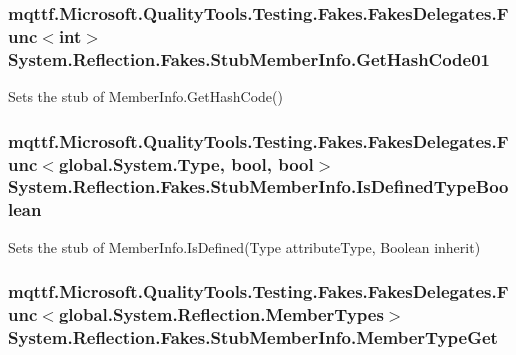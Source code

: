 \hypertarget{class_system_1_1_reflection_1_1_fakes_1_1_stub_member_info_aab0aca05e75dc1213439d8d64429dac8}{
\subsubsection[{Get\-Hash\-Code01}]{\setlength{\rightskip}{0pt plus 5cm}mqttf.\-Microsoft.\-Quality\-Tools.\-Testing.\-Fakes.\-Fakes\-Delegates.\-Func$<$int$>$ System.\-Reflection.\-Fakes.\-Stub\-Member\-Info.\-Get\-Hash\-Code01}}\label{class_system_1_1_reflection_1_1_fakes_1_1_stub_member_info_aab0aca05e75dc1213439d8d64429dac8}


Sets the stub of Member\-Info.\-Get\-Hash\-Code()

\hypertarget{class_system_1_1_reflection_1_1_fakes_1_1_stub_member_info_a39dee76f64c1b23616ba19839cd657ac}{
\subsubsection[{Is\-Defined\-Type\-Boolean}]{\setlength{\rightskip}{0pt plus 5cm}mqttf.\-Microsoft.\-Quality\-Tools.\-Testing.\-Fakes.\-Fakes\-Delegates.\-Func$<$global.\-System.\-Type, bool, bool$>$ System.\-Reflection.\-Fakes.\-Stub\-Member\-Info.\-Is\-Defined\-Type\-Boolean}}\label{class_system_1_1_reflection_1_1_fakes_1_1_stub_member_info_a39dee76f64c1b23616ba19839cd657ac}


Sets the stub of Member\-Info.\-Is\-Defined(\-Type attribute\-Type, Boolean inherit)

\hypertarget{class_system_1_1_reflection_1_1_fakes_1_1_stub_member_info_a2f5309aca05eca5468c601f5c2a8879d}{
\subsubsection[{Member\-Type\-Get}]{\setlength{\rightskip}{0pt plus 5cm}mqttf.\-Microsoft.\-Quality\-Tools.\-Testing.\-Fakes.\-Fakes\-Delegates.\-Func$<$global.\-System.\-Reflection.\-Member\-Types$>$ System.\-Reflection.\-Fakes.\-Stub\-Member\-Info.\-Member\-Type\-Get}}\label{class_system_1_1_reflection_1_1_fakes_1_1_stub_member_info_a2f5309aca05eca5468c601f5c2a8879d}


